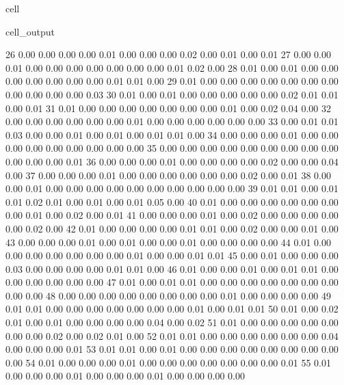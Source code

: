 \documentclass[letterpaper,10pt,french]{sphinxmanual}
\begin{document}
\begin{sphinxuseclass}{cell}
\begin{sphinxuseclass}{cell_output}
\begin{sphinxVerbatim}[commandchars=\\\{\}]
        26	0.00 	0.00 	0.00 	0.00 	0.01 	0.00 	0.00 	0.00 	0.02 	0.00 	0.01 	0.00 	0.01
        27	0.00 	0.00 	0.01 	0.00 	0.00 	0.00 	0.00 	0.00 	0.00 	0.00 	0.01 	0.02 	0.00
        28	0.01 	0.00 	0.01 	0.00 	0.00 	0.00 	0.00 	0.00 	0.00 	0.00 	0.01 	0.01 	0.00
        29	0.01 	0.00 	0.00 	0.00 	0.00 	0.00 	0.00 	0.00 	0.00 	0.00 	0.00 	0.00 	0.03
        30	0.01 	0.00 	0.01 	0.00 	0.00 	0.00 	0.00 	0.00 	0.02 	0.01 	0.01 	0.00 	0.01
        31	0.01 	0.00 	0.00 	0.00 	0.00 	0.00 	0.00 	0.00 	0.01 	0.00 	0.02 	0.04 	0.00
        32	0.00 	0.00 	0.00 	0.00 	0.00 	0.00 	0.01 	0.00 	0.00 	0.00 	0.00 	0.00 	0.00
        33	0.00 	0.01 	0.01 	0.03 	0.00 	0.00 	0.01 	0.00 	0.01 	0.00 	0.01 	0.01 	0.00
        34	0.00 	0.00 	0.00 	0.01 	0.00 	0.00 	0.00 	0.00 	0.00 	0.00 	0.00 	0.00 	0.00
        35	0.00 	0.00 	0.00 	0.00 	0.00 	0.00 	0.00 	0.00 	0.00 	0.00 	0.00 	0.00 	0.01
        36	0.00 	0.00 	0.00 	0.01 	0.00 	0.00 	0.00 	0.00 	0.02 	0.00 	0.00 	0.04 	0.00
        37	0.00 	0.00 	0.00 	0.01 	0.00 	0.00 	0.00 	0.00 	0.00 	0.00 	0.02 	0.00 	0.01
        38	0.00 	0.00 	0.01 	0.00 	0.00 	0.00 	0.00 	0.00 	0.00 	0.00 	0.00 	0.00 	0.00
        39	0.01 	0.01 	0.00 	0.01 	0.01 	0.02 	0.01 	0.00 	0.01 	0.00 	0.01 	0.05 	0.00
        40	0.01 	0.00 	0.00 	0.00 	0.00 	0.00 	0.00 	0.00 	0.01 	0.00 	0.02 	0.00 	0.01
        41	0.00 	0.00 	0.00 	0.01 	0.00 	0.02 	0.00 	0.00 	0.00 	0.00 	0.00 	0.02 	0.00
        42	0.01 	0.00 	0.00 	0.00 	0.00 	0.01 	0.01 	0.00 	0.02 	0.00 	0.00 	0.01 	0.00
        43	0.00 	0.00 	0.00 	0.01 	0.00 	0.01 	0.00 	0.00 	0.01 	0.00 	0.00 	0.00 	0.00
        44	0.01 	0.00 	0.00 	0.00 	0.00 	0.00 	0.00 	0.00 	0.01 	0.00 	0.00 	0.01 	0.01
        45	0.00 	0.01 	0.00 	0.00 	0.00 	0.03 	0.00 	0.00 	0.00 	0.00 	0.01 	0.01 	0.00
        46	0.01 	0.00 	0.00 	0.01 	0.00 	0.01 	0.01 	0.00 	0.00 	0.00 	0.00 	0.00 	0.00
        47	0.01 	0.00 	0.01 	0.01 	0.00 	0.00 	0.00 	0.00 	0.00 	0.00 	0.00 	0.00 	0.00
        48	0.00 	0.00 	0.00 	0.00 	0.00 	0.00 	0.00 	0.00 	0.01 	0.00 	0.00 	0.00 	0.00
        49	0.01 	0.01 	0.00 	0.00 	0.00 	0.00 	0.00 	0.00 	0.00 	0.01 	0.00 	0.01 	0.01
        50	0.01 	0.00 	0.02 	0.01 	0.00 	0.01 	0.00 	0.00 	0.00 	0.00 	0.04 	0.00 	0.02
        51	0.01 	0.00 	0.00 	0.00 	0.00 	0.00 	0.00 	0.00 	0.02 	0.00 	0.02 	0.01 	0.00
        52	0.01 	0.01 	0.00 	0.00 	0.00 	0.00 	0.00 	0.00 	0.04 	0.00 	0.00 	0.00 	0.01
        53	0.01 	0.01 	0.00 	0.01 	0.00 	0.00 	0.00 	0.00 	0.00 	0.00 	0.00 	0.00 	0.00
        54	0.01 	0.00 	0.00 	0.00 	0.01 	0.00 	0.00 	0.00 	0.00 	0.00 	0.00 	0.00 	0.01
        55	0.01 	0.00 	0.00 	0.00 	0.01 	0.00 	0.00 	0.00 	0.01 	0.00 	0.00 	0.00 	0.00

\end{sphinxVerbatim}
\end{sphinxuseclass}
\end{sphinxuseclass}
\end{document}

